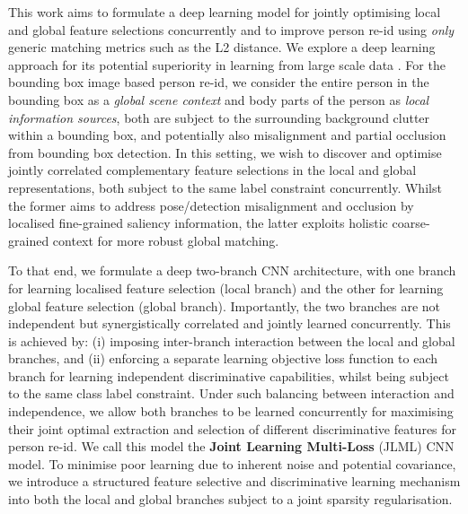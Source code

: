 \documentclass{article}
\begin{document}
This work aims to formulate a deep learning model for jointly
optimising local and global feature selections concurrently and 
to improve person re-id using {\em only} generic matching metrics such
as the L2 distance. We explore a deep learning approach for its
potential superiority in learning from large scale data
\cite{xiao2016learning,chen2016multi}.
For the bounding box image based person re-id, 
we consider the entire person in the bounding box as a {\em global scene context} and body
parts of the person as {\em local information sources}, both are subject to
the surrounding background clutter within a bounding box, and potentially
also misalignment and partial occlusion from bounding box detection.
In this setting, we wish to discover and optimise
jointly correlated complementary feature selections in the local and global
representations, both subject to the same label constraint concurrently. Whilst the
former aims to address pose/detection misalignment and occlusion by localised
fine-grained saliency information, the latter exploits holistic
coarse-grained context for more robust global matching.


To that end, we formulate a deep two-branch CNN architecture,
with one branch for learning localised feature selection (local branch)
and the other for learning global feature selection (global branch).
Importantly, the two branches are not independent but
synergistically correlated and jointly learned concurrently. 
This is achieved by: (i) imposing inter-branch interaction between the
local and global branches, and (ii) enforcing a separate learning
objective loss function to each branch
for learning independent discriminative capabilities, whilst being
subject to the same class label constraint.
Under such balancing between interaction and independence, 
we allow both branches to be learned concurrently 
for maximising their joint optimal extraction and selection of different
discriminative features for person re-id. 
We call this model the {\bf Joint Learning Multi-Loss} (JLML) CNN model.
To minimise poor learning due to inherent noise
and potential covariance, we introduce a structured feature selective
and discriminative learning mechanism into both the local and global
branches subject to a joint sparsity regularisation.
\end{document}
